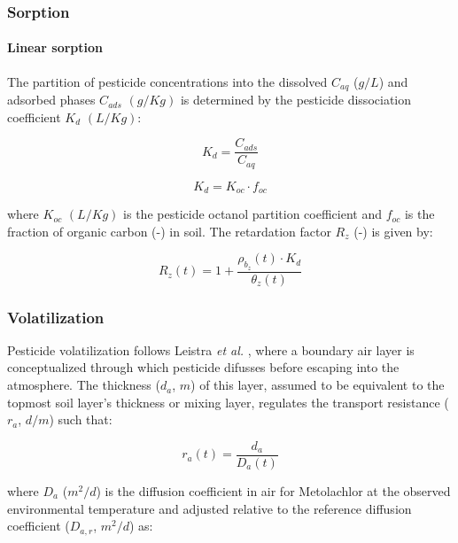 \documentclass[]{article}
\let\oldparagraph\paragraph
\renewcommand{\paragraph}[1]{\oldparagraph{#1}\mbox{}}
\begin{document}
\hypertarget{sorption}{%
\subsubsection{Sorption}\label{sorption}}

\hypertarget{linear-sorption}{%
\paragraph{Linear sorption}\label{linear-sorption}}

The partition of pesticide concentrations into the dissolved \(C_{aq}\)
(\(g/L\)) and adsorbed phases \(C_{ads}\) \((g/Kg)\) is determined by
the pesticide dissociation coefficient \(K_d\) \((L/Kg)\):

\begin{equation}
K_d = \frac{ C_{ads} }{ C_{aq}  }
\label{eq:kd}
\end{equation}

\begin{equation}
K_d = K_{oc} \cdot f_{oc}
\label{eq:kd}
\end{equation}

where \(K_{oc}\) \((L/Kg)\) is the pesticide octanol partition
coefficient and \(f_{oc}\) is the fraction of organic carbon (-) in
soil. The retardation factor \(R_z\) (-) is given by:

\begin{equation}
R_z(t) = 1 + \frac{ \rho_{b_z}(t) \cdot K_d }{ \theta_z(t) }
\label{eq:retard_linear}
\end{equation}

\hypertarget{volatilization}{%
\subsubsection{Volatilization}\label{volatilization}}

Pesticide volatilization follows Leistra \textit{et al.}
\citeyearpar{Leistra2001}, where a boundary air layer is conceptualized
through which pesticide difusses before escaping into the atmosphere.
The thickness (\(d_a\), \(m\)) of this layer, assumed to be equivalent
to the topmost soil layer's thickness or mixing layer, regulates the
transport resistance (\(r_a\), \(d/m\)) such that:

\begin{equation}
r_a(t) = \frac{ d_a }{ D_a(t) }
\label{eq:resistance_air}
\end{equation}

where \(D_a\) (\(m^2/d\)) is the diffusion coefficient in air for
Metolachlor at the observed environmental temperature and adjusted
relative to the reference diffusion coefficient (\(D_{a,r}\), \(m^2/d\))
as:
\end{document}
